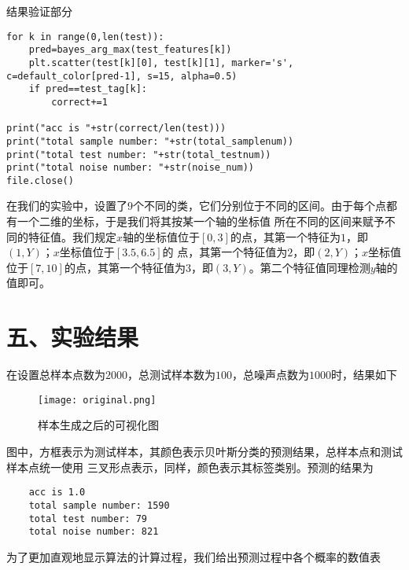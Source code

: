 \documentclass{article}
\begin{document}
结果验证部分
\begin{verbatim}
for k in range(0,len(test)):
    pred=bayes_arg_max(test_features[k])
    plt.scatter(test[k][0], test[k][1], marker='s', c=default_color[pred-1], s=15, alpha=0.5)
    if pred==test_tag[k]:
        correct+=1

print("acc is "+str(correct/len(test)))
print("total sample number: "+str(total_samplenum))
print("total test number: "+str(total_testnum))
print("total noise number: "+str(noise_num))
file.close()
\end{verbatim}
在我们的实验中，设置了$9$个不同的类，它们分别位于不同的区间。由于每个点都有一个二维的坐标，于是我们将其按某一个轴的坐标值
所在不同的区间来赋予不同的特征值。我们规定$x$轴的坐标值位于$[0,3]$的点，其第一个特征为$1$，即$(1,Y)$；$x$坐标值位于$[3.5,6.5]$的
点，其第一个特征值为$2$，即$(2,Y)$；$x$坐标值位于$[7,10]$的点，其第一个特征值为$3$，即$(3,Y)$。第二个特征值同理检测$y$轴的值即可。
\section*{\LARGE 五、实验结果}
在设置总样本点数为$2000$，总测试样本数为$100$，总噪声点数为$1000$时，结果如下
\begin{figure}[H]
    \centering
    \begin{minipage}[t]{1.0\linewidth}
        \centering
        \texttt{[image: original.png]}
        \caption{样本生成之后的可视化图}
    \end{minipage}
 \end{figure}
 图中，方框表示为测试样本，其颜色表示贝叶斯分类的预测结果，总样本点和测试样本点统一使用
 三叉形点表示，同样，颜色表示其标签类别。预测的结果为
 \begin{verbatim}
    acc is 1.0
    total sample number: 1590
    total test number: 79
    total noise number: 821
 \end{verbatim}
为了更加直观地显示算法的计算过程，我们给出预测过程中各个概率的数值表
\end{document}
